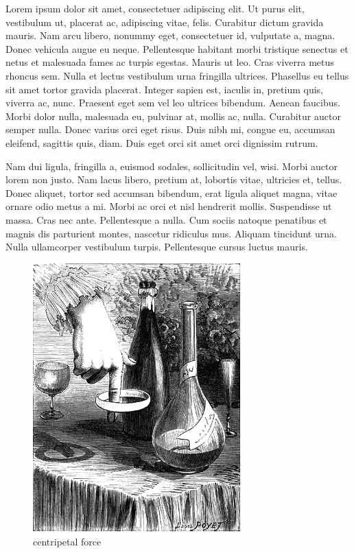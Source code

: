 Lorem ipsum dolor sit amet, consectetuer adipiscing elit. Ut purus elit, vestibulum ut, placerat ac, adipiscing vitae, felis. Curabitur dictum gravida mauris. Nam arcu libero, nonummy eget, consectetuer id, vulputate a, magna. Donec vehicula augue eu neque. Pellentesque habitant
morbi tristique senectus et netus et malesuada fames ac turpis egestas. Mauris ut leo. Cras
viverra metus rhoncus sem. Nulla et lectus vestibulum urna fringilla ultrices. Phasellus eu tellus sit amet tortor gravida placerat. Integer sapien est, iaculis in, pretium quis, viverra ac, nunc. Praesent eget sem vel leo ultrices bibendum. Aenean faucibus. Morbi dolor nulla, malesuada eu, pulvinar at, mollis ac, nulla. Curabitur auctor semper nulla. Donec varius orci eget risus. Duis nibh mi, congue eu, accumsan eleifend, sagittis quis, diam. Duis eget orci sit amet orci dignissim rutrum.

Nam dui ligula, fringilla a, euismod sodales, sollicitudin vel, wisi. Morbi auctor lorem non
justo. Nam lacus libero, pretium at, lobortis vitae, ultricies et, tellus. Donec aliquet, tortor sed accumsan bibendum, erat ligula aliquet magna, vitae ornare odio metus a mi. Morbi ac orci et nisl hendrerit mollis. Suspendisse ut massa. Cras nec ante. Pellentesque a nulla. Cum sociis natoque penatibus et magnis dis parturient montes, nascetur ridiculus mus. Aliquam tincidunt urna. Nulla ullamcorper vestibulum turpis. Pellentesque cursus luctus mauris.



\begin{figure}[h]
\centering
\includegraphics[width=80mm]{image/centforce.png}
\caption{centripetal force}
\end{figure}

